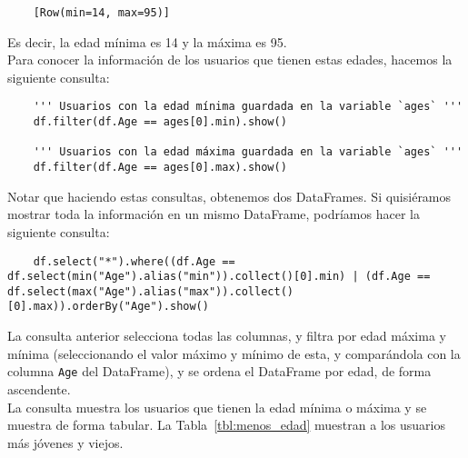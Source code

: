 \documentclass[12pt,a4paper,twoside,openright,titlepage,final]{article}
\begin{document}
\begin{enumerate}
	\begin{verbatim}
	[Row(min=14, max=95)]
	\end{verbatim}
	
	Es decir, la edad mínima es 14 y la máxima es 95.\\
	
	Para conocer la información de los usuarios que tienen estas edades, hacemos la siguiente consulta:
	
	\begin{verbatim}
	''' Usuarios con la edad mínima guardada en la variable `ages` '''
	df.filter(df.Age == ages[0].min).show()
	
	''' Usuarios con la edad máxima guardada en la variable `ages` '''
	df.filter(df.Age == ages[0].max).show()
	\end{verbatim}
	
	Notar que haciendo estas consultas, obtenemos dos DataFrames. Si quisiéramos mostrar toda la información en un mismo DataFrame, podríamos hacer la siguiente consulta:
	
	\begin{verbatim}
	df.select("*").where((df.Age == df.select(min("Age").alias("min")).collect()[0].min) | (df.Age == df.select(max("Age").alias("max")).collect()[0].max)).orderBy("Age").show()
	\end{verbatim}
	
	La consulta anterior selecciona todas las columnas, y filtra por edad máxima y mínima (seleccionando el valor máximo y mínimo de esta, y comparándola con la columna \texttt{Age} del DataFrame), y se ordena el DataFrame por edad, de forma ascendente.\\
	
	La consulta muestra los usuarios que tienen la edad mínima o máxima y se muestra de forma tabular. La Tabla~\ref{tbl:menos_edad} muestran a los usuarios más jóvenes y viejos.\\  
	

\end{enumerate}
\end{document}

